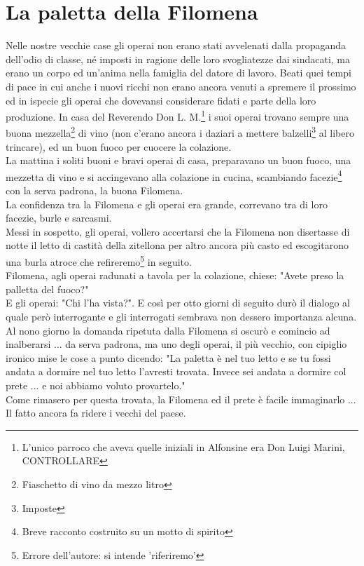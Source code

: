 
\chapter{La paletta della Filomena}
Nelle nostre vecchie case gli operai non erano stati avvelenati dalla propaganda dell'odio di classe, né imposti in ragione delle loro svogliatezze dai sindacati, ma erano un corpo ed un'anima nella famiglia del datore di lavoro. Beati quei tempi di pace in cui anche i nuovi ricchi non erano ancora venuti a spremere il prossimo ed in ispecie gli operai che dovevansi considerare fidati e parte della loro produzione. In casa del Reverendo Don L. M.\footnote{L'unico parroco che aveva quelle iniziali in Alfonsine era Don Luigi Marini, CONTROLLARE} i suoi operai trovano sempre una buona mezzella\footnote{Fiaschetto di vino da mezzo litro} di vino (non c'erano ancora i daziari a mettere balzelli\footnote{Imposte} al libero trincare), ed un buon fuoco per cuocere la colazione.\\
La mattina i soliti buoni e bravi operai di casa, preparavano un buon fuoco, una mezzetta di vino e si accingevano alla colazione in cucina, scambiando facezie\footnote{Breve racconto costruito su un motto di spirito} con la serva padrona, la buona Filomena.\\
La confidenza tra la Filomena e gli operai era grande, correvano tra di loro facezie, burle e sarcasmi. \\
Messi in sospetto, gli operai, vollero accertarsi che la Filomena non disertasse di notte il letto di castità della zitellona per altro ancora più casto ed escogitarono una burla atroce che refireremo\footnote{Errore dell'autore: si intende 'riferiremo'} in seguito. \\
Filomena, agli operai radunati a tavola per la colazione, chiese: "Avete preso la palletta del fuoco?"\\
E gli operai: "Chi l'ha vista?". E così per otto giorni di seguito durò il dialogo al quale però interrogante e gli interrogati sembrava non dessero importanza alcuna.\\
Al nono giorno la domanda ripetuta dalla Filomena si oscurò e comincio ad inalberarsi ... da serva padrona, ma uno degli operai, il più vecchio, con cipiglio ironico mise le cose a punto dicendo: "La paletta è nel tuo letto e se tu fossi andata a dormire nel tuo letto l'avresti trovata. Invece sei andata a dormire col prete ... e noi abbiamo voluto provartelo."\\
Come rimasero per questa trovata, la Filomena ed il prete è facile immaginarlo ... Il fatto ancora fa ridere i vecchi del paese.
